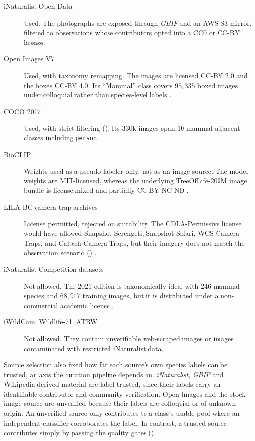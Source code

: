 \begin{description}
    \item[iNaturalist Open Data] Used. The photographs are exposed through \textit{GBIF} \cite{GBIF} and an AWS S3 mirror, filtered to observations whose contributors opted into a CC0 or CC-BY license.
    \item[Open Images V7] Used, with taxonomy remapping. The images are licensed CC-BY 2.0 and the boxes CC-BY 4.0. Its \enquote{Mammal} class covers $95{,}335$ boxed images under colloquial rather than species-level labels \cite{kuznetsovaOpenImagesDataset2020}.
    \item[COCO 2017] Used, with strict filtering (). Its $330\mathrm{k}$ images span $10$ mammal-adjacent classes including \texttt{person} \cite{linMicrosoftCOCOCommon2015}.
    \item[BioCLIP] Weights used as a pseudo-labeler only, not as an image source. The model weights are MIT-licensed, whereas the underlying TreeOfLife-200M image bundle is license-mixed and partially CC-BY-NC-ND \cite{stevensBioCLIPVisionFoundation2024}.
    \item[LILA BC camera-trap archives] License permitted, rejected on suitability. The CDLA-Permissive license would have allowed Snapshot Serengeti, Snapshot Safari, WCS Camera Traps, and Caltech Camera Traps, but their imagery does not match the observation scenario () \cite{LILABCLabeled}.
    \item[iNaturalist Competition datasets] Not allowed. The $2021$ edition is taxonomically ideal with $246$ mammal species and $68{,}917$ training images, but it is distributed under a non-commercial academic license \cite{hornINaturalistSpeciesClassification2018}.
    \item[iWildCam, Wildlife-71, ATRW] Not allowed. They contain unverifiable web-scraped images or images contaminated with restricted iNaturalist data.
\end{description}

Source selection also fixed how far each source's own species labels can be trusted, an axis the curation pipeline depends on. \textit{iNaturalist}, \textit{GBIF} and Wikipedia-derived material are label-trusted, since their labels carry an identifiable contributor and community verification. Open Images and the stock-image source are unverified because their labels are colloquial or of unknown origin. An unverified source only contributes to a class's usable pool where an independent classifier corroborates the label. In contrast, a trusted source contributes simply by passing the quality gates ().

